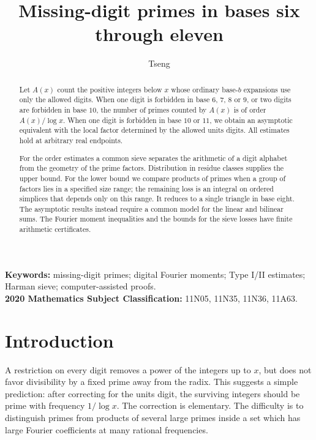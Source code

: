 \documentclass[11pt,a4paper]{article}
\title{\bfseries Missing-digit primes in bases six through eleven}
\author{Tseng}
\date{}
\theoremstyle{paperplain}
\numberwithin{equation}{section}
\begin{document}
\maketitle
\begin{abstract}
Let $A(x)$ count the positive integers below $x$ whose ordinary
base-$b$ expansions use only the allowed digits. When one digit is
forbidden in base $6$, $7$, $8$ or $9$, or two digits are forbidden
in base $10$, the number of primes counted by $A(x)$ is of order
$A(x)/\log x$. When one digit is forbidden in base $10$ or $11$, we
obtain an asymptotic equivalent with the local factor determined by
the allowed units digits. All estimates hold at arbitrary real endpoints.

For the order estimates a common sieve separates the arithmetic of a
digit alphabet from the geometry of the prime factors. Distribution in
residue classes supplies the upper bound. For the lower bound we compare
products of primes when a group of factors lies in a specified size
range; the remaining loss is an integral on ordered simplices that
depends only on this range. It reduces to a single triangle in base
eight. The asymptotic results instead require a common model for the
linear and bilinear sums. The Fourier moment inequalities and the
bounds for the sieve losses have finite arithmetic certificates.
\end{abstract}
\noindent\textbf{Keywords:} missing-digit primes; digital Fourier moments;
Type I/II estimates; Harman sieve; computer-assisted proofs.\\
\textbf{2020 Mathematics Subject Classification:} 11N05, 11N35, 11N36, 11A63.
\setcounter{tocdepth}{1}
\begingroup
\small
\linespread{.88}\selectfont
\setlength{\parskip}{0pt}
\tableofcontents
\endgroup
\setcounter{tocdepth}{1}
\newpage

\section{Introduction}
\label{sec:introduction}

A restriction on every digit removes a power of the integers up to $x$,
but does not favor divisibility by a fixed prime away from the radix.
This suggests a simple prediction: after correcting for the units digit,
the surviving integers should be prime with frequency $1/\log x$.
The correction is elementary. The difficulty is to distinguish primes
from products of several large primes inside a set which has large
Fourier coefficients at many rational frequencies.
\end{document}
